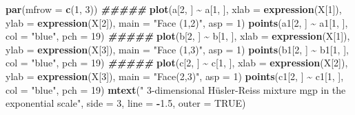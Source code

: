 \documentclass[
]{article}
\newenvironment{Shaded}{\begin{snugshade}}{\end{snugshade}}
\newcommand{\AttributeTok}[1]{\textcolor[rgb]{0.13,0.29,0.53}{#1}}
\newcommand{\ConstantTok}[1]{\textcolor[rgb]{0.56,0.35,0.01}{#1}}
\newcommand{\DecValTok}[1]{\textcolor[rgb]{0.00,0.00,0.81}{#1}}
\newcommand{\DocumentationTok}[1]{\textcolor[rgb]{0.56,0.35,0.01}{\textbf{\textit{#1}}}}
\newcommand{\FloatTok}[1]{\textcolor[rgb]{0.00,0.00,0.81}{#1}}
\newcommand{\FunctionTok}[1]{\textcolor[rgb]{0.13,0.29,0.53}{\textbf{#1}}}
\newcommand{\NormalTok}[1]{#1}
\newcommand{\SpecialCharTok}[1]{\textcolor[rgb]{0.81,0.36,0.00}{\textbf{#1}}}
\newcommand{\StringTok}[1]{\textcolor[rgb]{0.31,0.60,0.02}{#1}}
\begin{document}
\begin{Shaded}
\begin{Highlighting}[]
\FunctionTok{par}\NormalTok{(}\AttributeTok{mfrow =} \FunctionTok{c}\NormalTok{(}\DecValTok{1}\NormalTok{, }\DecValTok{3}\NormalTok{))}
\DocumentationTok{\#\#\#\#\#}
\FunctionTok{plot}\NormalTok{(a[}\DecValTok{2}\NormalTok{, ] }\SpecialCharTok{\textasciitilde{}}\NormalTok{ a[}\DecValTok{1}\NormalTok{, ], }\AttributeTok{xlab =} \FunctionTok{expression}\NormalTok{(X[}\DecValTok{1}\NormalTok{]), }\AttributeTok{ylab =} \FunctionTok{expression}\NormalTok{(X[}\DecValTok{2}\NormalTok{]), }\AttributeTok{main =} \StringTok{"Face (1,2)"}\NormalTok{, }\AttributeTok{asp =} \DecValTok{1}\NormalTok{)}
\FunctionTok{points}\NormalTok{(a1[}\DecValTok{2}\NormalTok{, ] }\SpecialCharTok{\textasciitilde{}}\NormalTok{ a1[}\DecValTok{1}\NormalTok{, ], }\AttributeTok{col =} \StringTok{"blue"}\NormalTok{, }\AttributeTok{pch =} \DecValTok{19}\NormalTok{)}
\DocumentationTok{\#\#\#\#\#}
\FunctionTok{plot}\NormalTok{(b[}\DecValTok{2}\NormalTok{, ] }\SpecialCharTok{\textasciitilde{}}\NormalTok{ b[}\DecValTok{1}\NormalTok{, ], }\AttributeTok{xlab =} \FunctionTok{expression}\NormalTok{(X[}\DecValTok{1}\NormalTok{]), }\AttributeTok{ylab =} \FunctionTok{expression}\NormalTok{(X[}\DecValTok{3}\NormalTok{]), }\AttributeTok{main =} \StringTok{"Face (1,3)"}\NormalTok{, }\AttributeTok{asp =} \DecValTok{1}\NormalTok{)}
\FunctionTok{points}\NormalTok{(b1[}\DecValTok{2}\NormalTok{, ] }\SpecialCharTok{\textasciitilde{}}\NormalTok{ b1[}\DecValTok{1}\NormalTok{, ], }\AttributeTok{col =} \StringTok{"blue"}\NormalTok{, }\AttributeTok{pch =} \DecValTok{19}\NormalTok{)}
\DocumentationTok{\#\#\#\#\#}
\FunctionTok{plot}\NormalTok{(c[}\DecValTok{2}\NormalTok{, ] }\SpecialCharTok{\textasciitilde{}}\NormalTok{ c[}\DecValTok{1}\NormalTok{, ], }\AttributeTok{xlab =} \FunctionTok{expression}\NormalTok{(X[}\DecValTok{2}\NormalTok{]), }\AttributeTok{ylab =} \FunctionTok{expression}\NormalTok{(X[}\DecValTok{3}\NormalTok{]), }\AttributeTok{main =} \StringTok{"Face(2,3)"}\NormalTok{, }\AttributeTok{asp =} \DecValTok{1}\NormalTok{)}
\FunctionTok{points}\NormalTok{(c1[}\DecValTok{2}\NormalTok{, ] }\SpecialCharTok{\textasciitilde{}}\NormalTok{ c1[}\DecValTok{1}\NormalTok{, ], }\AttributeTok{col =} \StringTok{"blue"}\NormalTok{, }\AttributeTok{pch =} \DecValTok{19}\NormalTok{)}
\FunctionTok{mtext}\NormalTok{(}\StringTok{" 3{-}dimensional Hüsler{-}Reiss mixture mgp in the exponential scale"}\NormalTok{, }\AttributeTok{side =} \DecValTok{3}\NormalTok{, }\AttributeTok{line =} \SpecialCharTok{{-}}\FloatTok{1.5}\NormalTok{, }\AttributeTok{outer =} \ConstantTok{TRUE}\NormalTok{)}
\end{Highlighting}
\end{Shaded}
\end{document}
